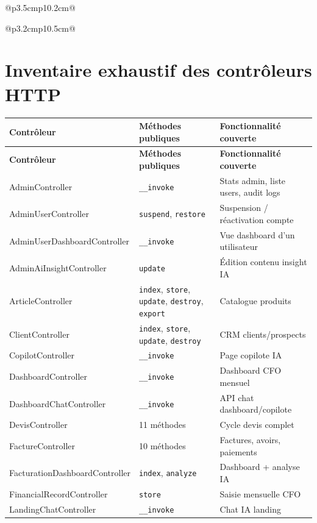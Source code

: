 \documentclass[11pt,a4paper]{report}
\begin{document}
\begin{longtable}{@{}p{3.5cm}p{10.2cm}@{}}
\begin{longtable}{@{}p{3.2cm}p{10.5cm}@{}}
\appendix

\chapter{Inventaire exhaustif des contrôleurs HTTP}
\label{annexe:controllers}

\begingroup
\footnotesize
\begin{longtable}{@{}p{3.8cm}p{5.5cm}p{5.2cm}@{}}
\toprule
\textbf{Contrôleur} & \textbf{Méthodes publiques} & \textbf{Fonctionnalité couverte} \\
\midrule
\endfirsthead
\toprule
\textbf{Contrôleur} & \textbf{Méthodes publiques} & \textbf{Fonctionnalité couverte} \\
\midrule
\endhead
\bottomrule
\endfoot
AdminController & \texttt{\_\_invoke} & Stats admin, liste users, audit logs \\
AdminUserController & \texttt{suspend}, \texttt{restore} & Suspension / réactivation compte \\
AdminUserDashboardController & \texttt{\_\_invoke} & Vue dashboard d'un utilisateur \\
AdminAiInsightController & \texttt{update} & Édition contenu insight IA \\
ArticleController & \texttt{index}, \texttt{store}, \texttt{update}, \texttt{destroy}, \texttt{export} & Catalogue produits \\
ClientController & \texttt{index}, \texttt{store}, \texttt{update}, \texttt{destroy} & CRM clients/prospects \\
CopilotController & \texttt{\_\_invoke} & Page copilote IA \\
DashboardController & \texttt{\_\_invoke} & Dashboard CFO mensuel \\
DashboardChatController & \texttt{\_\_invoke} & API chat dashboard/copilote \\
DevisController & 11 méthodes & Cycle devis complet \\
FactureController & 10 méthodes & Factures, avoirs, paiements \\
FacturationDashboardController & \texttt{index}, \texttt{analyze} & Dashboard + analyse IA \\
FinancialRecordController & \texttt{store} & Saisie mensuelle CFO \\
LandingChatController & \texttt{\_\_invoke} & Chat IA landing \\

\end{longtable}
\end{longtable}
\end{longtable}
\end{document}
